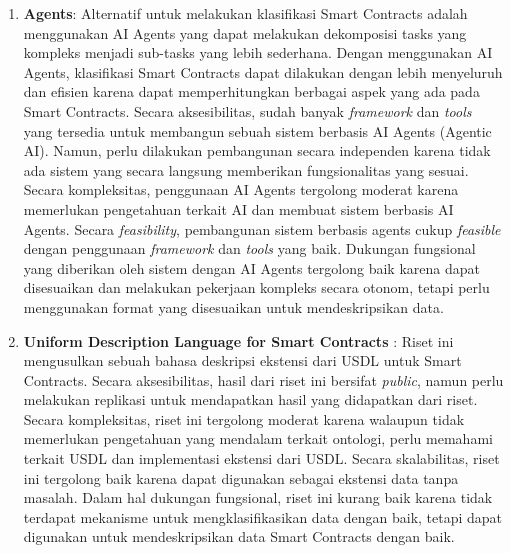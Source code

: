 \begin{enumerate}
    \item \textbf{Agents}: Alternatif untuk melakukan klasifikasi Smart Contracts adalah menggunakan AI Agents yang dapat melakukan dekomposisi tasks yang kompleks menjadi sub-tasks yang lebih sederhana. Dengan menggunakan AI Agents, klasifikasi Smart Contracts dapat dilakukan dengan lebih menyeluruh dan efisien karena dapat memperhitungkan berbagai aspek yang ada pada Smart Contracts. Secara aksesibilitas, sudah banyak \textit{framework} dan \textit{tools} yang tersedia untuk membangun sebuah sistem berbasis AI Agents (Agentic AI). Namun, perlu dilakukan pembangunan secara independen karena tidak ada sistem yang secara langsung memberikan fungsionalitas yang sesuai. Secara kompleksitas, penggunaan AI Agents tergolong moderat karena memerlukan pengetahuan terkait AI dan membuat sistem berbasis AI Agents. Secara \textit{feasibility}, pembangunan sistem berbasis agents cukup \textit{feasible} dengan penggunaan \textit{framework} dan \textit{tools} yang baik. Dukungan fungsional yang diberikan oleh sistem dengan AI Agents tergolong baik karena dapat disesuaikan dan melakukan pekerjaan kompleks secara otonom, tetapi perlu menggunakan format yang disesuaikan untuk mendeskripsikan data.

    \item \textbf{Uniform Description Language for Smart Contracts} \parencite{udlsc}: Riset ini mengusulkan sebuah bahasa deskripsi ekstensi dari USDL untuk Smart Contracts. Secara aksesibilitas, hasil dari riset ini bersifat \textit{public}, namun perlu melakukan replikasi untuk mendapatkan hasil yang didapatkan dari riset. Secara kompleksitas, riset ini tergolong moderat karena walaupun tidak memerlukan pengetahuan yang mendalam terkait ontologi, perlu memahami terkait USDL dan implementasi ekstensi dari USDL. Secara skalabilitas, riset ini tergolong baik karena dapat digunakan sebagai ekstensi data tanpa masalah. Dalam hal dukungan fungsional, riset ini kurang baik karena tidak terdapat mekanisme untuk mengklasifikasikan data dengan baik, tetapi dapat digunakan untuk mendeskripsikan data Smart Contracts dengan baik.
    

\end{enumerate}
